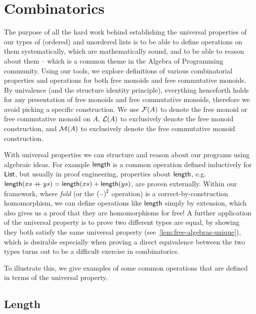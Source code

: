 
\section{Combinatorics}
\label{sec:combinatorics}

The purpose of all the hard work behind establishing the universal properties of our types of (ordered) and unordered
lists is to be able to define operations on them systematically, which are mathematically sound, and to be able to
reason about them -- which is a common theme in the Algebra of Programming~\cite{birdAlgebraProgramming1997} community.
%
Using our tools, we explore definitions of various combinatorial properties and operations for both
free monoids and free commutative monoids.
%
By univalence (and the structure identity principle), everything henceforth holds for any presentation of free monoids
and free commutative monoids, therefore we avoid picking a specific construction.
%
We use $\mathcal{F}(A)$ to denote the free monoid or free commutative monoid on $A$, $\mathcal{L}(A)$ to exclusively denote the free
monoid construction, and $\mathcal{M}(A)$ to exclusively denote the free commutative monoid construction.

With universal properties we can structure and reason about our programs using algebraic ideas.
%
For example $\operatorname{\mathsf{length}}$ is a common operation defined inductively for $\operatorname{\mathsf{List}}$,
but usually in proof engineering, properties about $\operatorname{\mathsf{length}}$, e.g.
$\operatorname{\mathsf{length}}(xs \mathbin{+\kern -0.4em+} ys) = \operatorname{\mathsf{length}}(xs) + \operatorname{\mathsf{length}}(ys)$,
are proven externally.
%
Within our framework, where \emph{fold} (or the ${({\scriptstyle{-}})}^{\sharp}$ operation) is a correct-by-construction homomorphism,
we can define operations like $\operatorname{\mathsf{length}}$ simply by extension,
which also gives us a proof that they are homomorphisms for free!
%
A further application of the universal property is to prove two different types are equal, by showing they both satisfy
the same universal property (see~\cref{lem:free-algebras-unique}), which is desirable especially when proving a direct
equivalence between the two types turns out to be a difficult exercise in combinatorics.

To illustrate this, we give examples of some common operations that are defined in terms of the universal property.

\subsection{Length}

